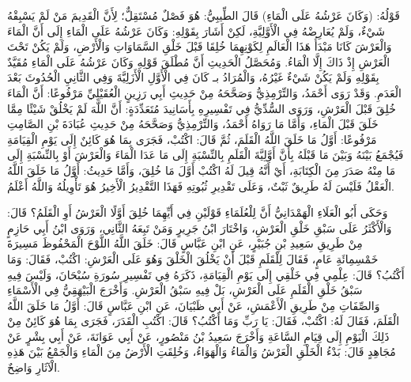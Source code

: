 قَوْلُهُ: (وَكَانَ عَرْشُهُ عَلَى الْمَاءِ) قَالَ الطِّيبِيُّ: هُوَ فَصْلٌ مُسْتَقِلٌّ؛ لِأَنَّ الْقَدِيمَ مَنْ لَمْ يَسْبِقْهُ شَيْءٌ، وَلَمْ يُعَارِضْهُ فِي الْأَوَّلِيَّةِ، لَكِنْ أَشَارَ بِقَوْلِهِ: وَكَانَ عَرْشُهُ عَلَى الْمَاءِ إِلَى أَنَّ الْمَاءَ وَالْعَرْشَ كَانَا مَبْدَأُ هَذَا الْعَالَمِ لِكَوْنِهِمَا خُلِقَا قَبْلَ خَلْقِ السَّمَاوَاتِ وَالْأَرْضِ، وَلَمْ يَكُنْ تَحْتَ الْعَرْشِ إِذْ ذَاكَ إِلَّا الْمَاءُ. وَمُحَصَّلُ الْحَدِيثِ أَنَّ مُطْلَقَ قَوْلِهِ وَكَانَ عَرْشُهُ عَلَى الْمَاءِ مُقَيَّدٌ بِقَوْلِهِ وَلَمْ يَكُنْ شَيْءٌ غَيْرُهُ، وَالْمُرَادُ بـ كَانَ فِي الْأَوَّلِ الْأَزَلِيَّةَ وَفِي الثَّانِيِ الْحُدُوثَ بَعْدَ الْعَدَمِ. وَقَدْ رَوَى أَحْمَدُ، وَالتِّرْمِذِيُّ وَصَحَّحَهُ مِنْ حَدِيثِ أَبِي رَزِينٍ الْعُقَيْلِيِّ مَرْفُوعًا: أَنَّ الْمَاءَ خُلِقَ قَبْلَ الْعَرْشِ، وَرَوَى السُّدِّيُّ فِي تَفْسِيرِهِ بِأَسَانِيدَ مُتَعَدِّدَةٍ: أَنَّ اللَّهَ لَمْ يَخْلُقْ شَيْئًا مِمَّا خَلَقَ قَبْلَ الْمَاءِ، وَأَمَّا مَا رَوَاهُ أَحْمَدُ، وَالتِّرْمِذِيُّ وَصَحَّحَهُ مِنْ حَدِيثِ عُبَادَةَ بْنِ الصَّامِتِ مَرْفُوعًا: أَوَّلُ مَا خَلَقَ اللَّهُ الْقَلَمَ، ثُمَّ قَالَ: اكْتُبْ، فَجَرَى بِمَا هُوَ كَائِنٌ إِلَى يَوْمِ الْقِيَامَةِ فَيُجْمَعُ بَيْنَهُ وَبَيْنَ مَا قَبْلَهُ بِأَنَّ أَوَّلِيَّةَ الْقَلَمِ بِالنِّسْبَةِ إِلَى مَا عَدَا الْمَاءَ وَالْعَرْشَ أَوْ بِالنِّسْبَةِ إِلَى مَا مِنْهُ صَدَرَ مِنَ الْكِتَابَةِ، أَيْ أَنَّهُ قِيلَ لَهُ اكْتُبْ أَوَّلَ مَا خُلِقَ، وَأَمَّا حَدِيثُ: أَوَّلُ مَا خَلَقَ اللَّهُ الْعَقْلُ فَلَيْسَ لَهُ طَرِيقٌ ثَبْتٌ، وَعَلَى تَقْدِيرِ ثُبُوتِهِ فَهَذَا التَّقْدِيرُ الْأَخِيرُ هُوَ تَأْوِيلُهُ وَاللَّهُ أَعْلَمُ.

وَحَكَى أَبُو الْعَلَاءِ الْهَمْدَانِيُّ أَنَّ لِلْعُلَمَاءِ قَوْلَيْنِ فِي أَيِّهِمَا خُلِقَ أَوَّلًا الْعَرْشُ أَوِ الْقَلَمُ؟ قَالَ: وَالْأَكْثَرُ عَلَى سَبْقِ خَلْقِ الْعَرْشِ، وَاخْتَارَ ابْنُ جَرِيرٍ وَمَنْ تَبِعَهُ الثَّانِي، وَرَوَى ابْنُ أَبِي حَازِمٍ مِنْ طَرِيقِ سَعِيدِ بْنِ جُبَيْرٍ، عَنِ ابْنِ عَبَّاسٍ قَالَ: خَلَقَ اللَّهُ اللَّوْحَ الْمَحْفُوظَ مَسِيرَةَ خَمْسِمِائَةِ عَامٍ، فَقَالَ لِلْقَلَمِ قَبْلَ أَنْ يَخْلُقَ الْخَلْقَ وَهُوَ عَلَى الْعَرْشِ: اكْتُبْ، فَقَالَ: وَمَا أَكْتُبُ؟ قَالَ: عِلْمِي فِي خَلْقِي إِلَى يَوْمِ الْقِيَامَةِ، ذَكَرَهُ فِي تَفْسِيرِ سُورَةِ سُبْحَانَ، وَلَيْسَ فِيهِ سَبْقُ خَلْقِ الْقَلَمِ عَلَى الْعَرْشِ، بَلْ فِيهِ سَبْقُ الْعَرْشِ. وَأَخْرَجَ الْبَيْهَقِيُّ فِي الْأَسْمَاءِ وَالصِّفَاتِ مِنْ طَرِيقِ الْأَعْمَشِ، عَنْ أَبِي ظَبْيَانَ، عَنِ ابْنِ عَبَّاسٍ قَالَ: أَوَّلُ مَا خَلَقَ اللَّهُ الْقَلَمَ، فَقَالَ لَهُ: اكْتُبْ، فَقَالَ: يَا رَبِّ وَمَا أَكْتُبُ؟ قَالَ: اكْتُبِ الْقَدَرَ، فَجَرَى بِمَا هُوَ كَائِنٌ مِنْ ذَلِكَ الْيَوْمِ إِلَى قِيَامِ السَّاعَةِ وَأَخْرَجَ سَعِيدُ بْنُ مَنْصُورٍ، عَنْ أَبِي عَوَانَةَ، عَنْ أَبِي بِشْرٍ عَنْ مُجَاهِدٍ قَالَ: بَدْءُ الْخَلْقِ الْعَرْشُ وَالْمَاءُ وَالْهَوَاءُ، وَخُلِقَتِ الْأَرْضُ مِنَ الْمَاءِ وَالْجَمْعُ بَيْنَ هَذِهِ الْآثَارِ وَاضِحٌ.

